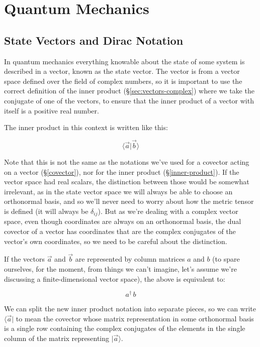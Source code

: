 \chapter{Quantum Mechanics} \label{ch:qm}

\section{State Vectors and Dirac Notation}

In quantum mechanics everything knowable about the state of some system is described in a vector, known as the state vector. The vector is from a vector space defined over the field of complex numbers, so it is important to use the correct definition of the inner product (§\ref{sec:vectors-complex}) where we take the conjugate of one of the vectors, to ensure that the inner product of a vector with itself is a positive real number.

The inner product in this context is written like this:

$$\langle \vec{a}|\vec{b} \rangle$$

Note that this is not the same as the notations we've used for a covector acting on a vector (§\ref{covector}), nor for the inner product (§\ref{inner-product}). If the vector space had real scalars, the distinction between those would be somewhat irrelevant, as in the state vector space we will always be able to choose an orthonormal basis, and so we'll never need to worry about how the metric tensor is defined (it will always be $\delta_{ij}$). But as we're dealing with a complex vector space, even though coordinates are always on an orthonormal basis, the dual covector of a vector has coordinates that are the complex conjugates of the vector's own coordinates, so we need to be careful about the distinction.

If the vectors $\vec{a}$ and $\vec{b}$ are represented by column matrices $a$ and $b$ (to spare ourselves, for the moment, from things we can't imagine, let's assume we're discussing a finite-dimensional vector space), the above is equivalent to:

$$a^{\dagger} \, b$$

We can split the new inner product notation into separate pieces, so we can write $\langle \vec{a}|$ to mean the covector whose matrix representation in some orthonormal basis is a single row containing the complex conjugates of the elements in the single column of the matrix representing $|\vec{a} \rangle$.

